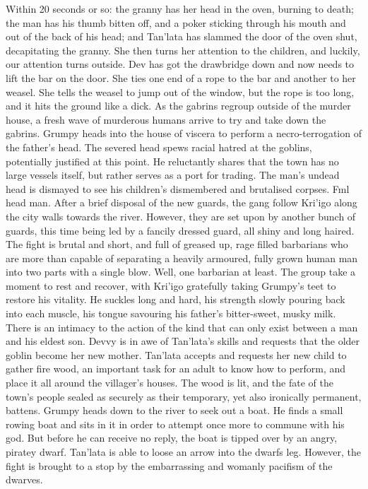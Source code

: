 Within 20 seconds or so: the granny has her head in the oven, burning to death; the man has his thumb bitten off, and a poker sticking through his mouth and out of the back of his head; and Tan’lata has slammed the door of the oven shut, decapitating the granny. She then turns her attention to the children, and luckily, our attention turns outside.\medskip
Dev has got the drawbridge down and now needs to lift the bar on the door. She ties one end of a rope to the bar and another to her weasel. She tells the weasel to jump out of the window, but the rope is too long, and it hits the ground like a dick.\medskip
As the gabrins regroup outside of the murder house, a fresh wave of murderous humans arrive to try and take down the gabrins.\medskip
Grumpy heads into the house of viscera to perform a necro-terrogation of the father’s head. The severed head spews racial hatred at the goblins, potentially justified at this point. He reluctantly shares that the town has no large vessels itself, but rather serves as a port for trading. The man’s undead head is dismayed to see his children’s dismembered and brutalised corpses. Fml head man.\medskip
After a brief disposal of the new guards, the gang follow Kri'igo along the city walls towards the river. However, they are set upon by another bunch of guards, this time being led by a fancily dressed guard, all shiny and long haired.\medskip
The fight is brutal and short, and full of greased up, rage filled barbarians who are more than capable of separating a heavily armoured, fully grown human man into two parts with a single blow. Well, one barbarian at least.\medskip
The group take a moment to rest and recover, with Kri'igo gratefully taking Grumpy’s teet to restore his vitality. He suckles long and hard, his strength slowly pouring back into each muscle, his tongue savouring his father’s bitter-sweet, musky milk. There is an intimacy to the action of the kind that can only exist between a man and his eldest son.\medskip
Devvy is in awe of Tan’lata’s skills and requests that the older goblin become her new mother. Tan’lata accepts and requests her new child to gather fire wood, an important task for an adult to know how to perform, and place it all around the villager’s houses. The wood is lit, and the fate of the town’s people sealed as securely as their temporary, yet also ironically permanent, battens.\medskip
Grumpy heads down to the river to seek out a boat. He finds a small rowing boat and sits in it in order to attempt once more to commune with his god. But before he can receive no reply, the boat is tipped over by an angry, piratey dwarf. Tan’lata is able to loose an arrow into the dwarfs leg. However, the fight is brought to a stop by the embarrassing and womanly pacifism of the dwarves.\medskip
